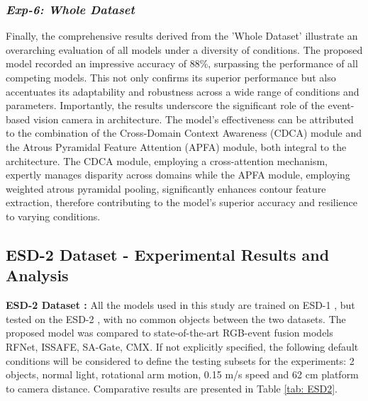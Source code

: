 \documentclass[lettersize,journal]{IEEEtran}
\begin{document}
\subsubsection{\textbf{\textit{Exp-6: Whole Dataset}}} 
\label{subsubsection : Whole Dataset}


Finally, the comprehensive results derived from the 'Whole Dataset' illustrate an overarching evaluation of all models under a diversity of conditions. The proposed model recorded an impressive accuracy of 88\%, surpassing the performance of all competing models. This not only confirms its superior performance but also accentuates its adaptability and robustness across a wide range of conditions and parameters. Importantly, the results underscore the significant role of the event-based vision camera in architecture. The model's effectiveness can be attributed to the combination of the Cross-Domain Context Awareness (CDCA) module and the Atrous Pyramidal Feature Attention (APFA) module, both integral to the architecture. The CDCA module, employing a cross-attention mechanism, expertly manages disparity across domains while the APFA module, employing weighted atrous pyramidal pooling, significantly enhances contour feature extraction, therefore contributing to the model's superior accuracy and resilience to varying conditions.




\subsection{\textbf{ESD-2 Dataset - Experimental Results and Analysis}}
\label{section:Results ESD-2 Dataset}

\textbf{ESD-2 Dataset :} All the models used in this study are trained on ESD-1 , but tested on the ESD-2 \cite{Huang2023AEnvironment}, with no common objects between the two datasets. The proposed model was compared to state-of-the-art RGB-event fusion models RFNet, ISSAFE, SA-Gate, CMX\cite{Liu2022CMX:Transformers}. If not explicitly specified, the following
default conditions will be considered to define the testing subsets for the experiments: 2 objects, normal light, rotational arm motion, 0.15 m/s speed and 62 cm platform to camera distance.  Comparative results are presented in Table \ref{tab: ESD2}.
\end{document}

